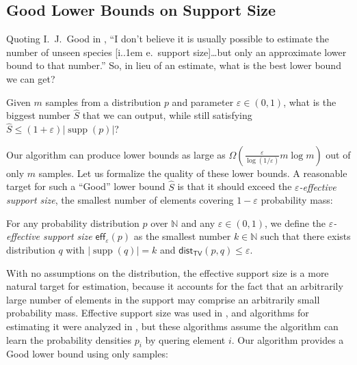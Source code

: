 \documentclass{theoretics}
\newcommand*\ie{i.\kern.1em e.\ }
\DeclareMathOperator{\supp}{supp}   %
\newcommand{\dist}{\mathsf{dist}}
\newcommand{\bN}{\ensuremath{\mathbb{N}}}
\newcommand{\TV}{\mathsf{TV}}
\newcommand{\eff}{\mathsf{eff}}
\renewcommand{\epsilon}{\varepsilon}
\begin{document}
\subsection{Good Lower Bounds on Support Size}
Quoting I.~J.~Good in \cite{BF93}, ``I don't believe it is usually possible to estimate the number
of unseen species [\ie support size]\dots but only an approximate lower bound to that number.'' So,
in lieu of an estimate, what is the best lower bound we can get?
\begin{question}
\label{question:good-lb}
Given $m$ samples from a distribution $p$ and parameter $\epsilon \in (0,1)$, what is the biggest
number $\widehat S$ that we can output, while still satisfying $\widehat S \leq
(1+\epsilon)|\supp(p)|$?
\end{question}
Our algorithm can produce lower bounds as large as $\Omega(\tfrac{\epsilon}{\log(1/\epsilon)} m \log
m)$ out of only $m$ samples. Let us formalize the quality of these lower bounds.  A reasonable
target for such a ``Good'' lower bound $\widehat S$ is that it should exceed the
\emph{$\epsilon$-effective support size}, the smallest number of elements covering $1-\epsilon$
probability mass:

\begin{definition}
\label{def:effective}
For any probability distribution $p$ over $\bN$ and any $\epsilon \in (0,1)$, we define the
\emph{$\epsilon$-effective support size} $\eff_\epsilon(p)$ as the smallest number $k \in \bN$
such that there exists distribution $q$ with $|\supp(q)|=k$ and $\dist_\TV(p,q) \leq \epsilon$.
\end{definition}

\noindent
With no assumptions on the distribution, the effective support size is a more natural target for
estimation, because it accounts for the fact that an arbitrarily large number of elements in the
support may comprise an arbitrarily small probability mass. Effective support size was used in
\cite{CDS18,BCG19}, and algorithms for estimating it were analyzed in \cite{Gol19vdf,NT23,Gol25},
but these algorithms assume the algorithm can learn the probability densities $p_i$ by quering
element $i$. Our algorithm provides a Good lower bound using only samples:
\end{document}
